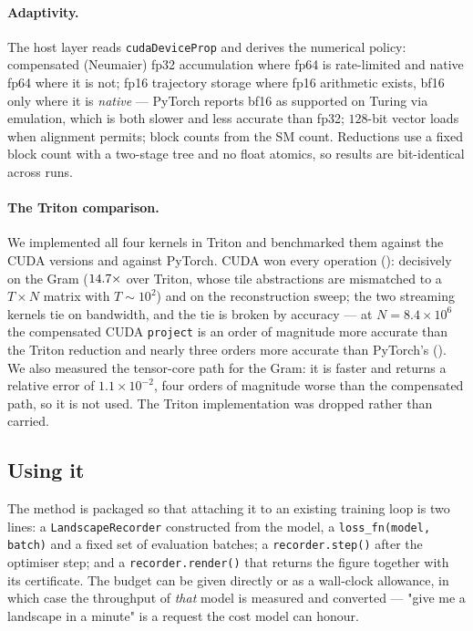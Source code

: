\documentclass[11pt]{article}
\theoremstyle{definition}
\begin{document}
\paragraph{Adaptivity.} The host layer reads \texttt{cudaDeviceProp} and derives the
numerical policy: compensated (Neumaier) fp32 accumulation where fp64 is rate-limited
and native fp64 where it is not; fp16 trajectory storage where fp16 arithmetic exists,
bf16 only where it is \emph{native} --- PyTorch reports bf16 as supported on Turing via
emulation, which is both slower and less accurate than fp32; $128$-bit vector loads when
alignment permits; block counts from the SM count. Reductions use a fixed block count
with a two-stage tree and no float atomics, so results are bit-identical across runs.

\paragraph{The Triton comparison.} We implemented all four kernels in Triton
\citep{tillet2019triton} and benchmarked them against the CUDA versions and against
PyTorch. CUDA won every operation (): decisively on the Gram
($14.7\times$ over Triton, whose tile abstractions are mismatched to a
$T\times N$ matrix with $T\sim10^2$) and on the reconstruction sweep; the two streaming
kernels tie on bandwidth, and the tie is broken by accuracy --- at $N=8.4\times10^6$ the
compensated CUDA \texttt{project} is an order of magnitude more accurate than the Triton
reduction and nearly three orders more accurate than PyTorch's (). We also measured the tensor-core path for the Gram: it is faster and
returns a relative error of $1.1\times10^{-2}$, four orders of magnitude worse than the
compensated path, so it is not used. The Triton implementation was dropped rather than
carried.

\subsection{Using it}

The method is packaged so that attaching it to an existing training loop is two lines:
a \texttt{LandscapeRecorder} constructed from the model, a
\texttt{loss\_fn(model, batch)} and a fixed set of evaluation batches; a
\texttt{recorder.step()} after the optimiser step; and a \texttt{recorder.render()} that
returns the figure together with its certificate. The budget can be given directly or as
a wall-clock allowance, in which case the throughput of \emph{that} model is measured and
converted --- "give me a landscape in a minute" is a request the cost model can honour.
\end{document}
